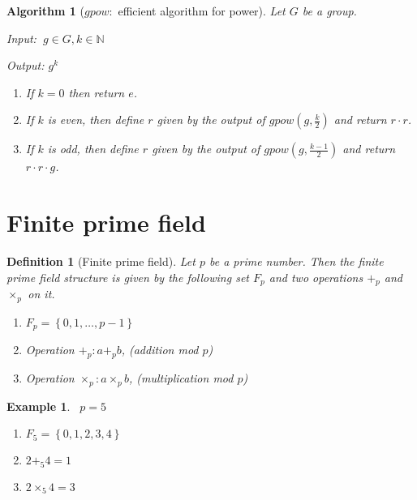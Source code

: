 \documentclass{article}%
\newtheorem{algorithm}[theorem]{Algorithm}
\newtheorem{definition}[theorem]{Definition}
\newtheorem{example}[theorem]{Example}
\begin{document}
\begin{algorithm}
[$gpow:$ efficient algorithm for power]Let $G$ be a group.

\noindent Input: $\ g\in G,k\in\mathbb{N}$

\noindent Output: $g^{k}$

\begin{enumerate}
\item If $k=0$ then return $e$.

\item If $k$ is even, then define $r$ given by the output of $gpow(g,\frac{k}{2})$ and return $r\cdot r$.
\item If $k$ is odd, then define $r$ given by the output of $gpow(g,\frac{k-1}{2})$ and return $r \cdot r \cdot g$.
\end{enumerate}
\end{algorithm}

\section{Finite prime field}

\begin{definition}
[Finite prime field]Let $p$ be a prime number. Then the finite prime field structure
is given by the following set $F_{p}$ and two operations $+_{p}$ and
$\times_{p}$ on it.

\begin{enumerate}
\item $F_{p}=\left\{  0,1,\ldots,p-1\right\}  $

\item Operation $+_{p}: a+_{p}b$, (addition mod $p$)

\item Operation $\times_{p}: a\times_{p}b$, (multiplication mod $p$)
\end{enumerate}
\end{definition}

\begin{example}
\ $p=5$

\begin{enumerate}
\item $F_5=\left\{0,1,2,3,4\right\}  $

\item $2+_{5} 4= 1$

\item $2\times_{5} 4= 3$
\end{enumerate}
\end{example}
\end{document}
